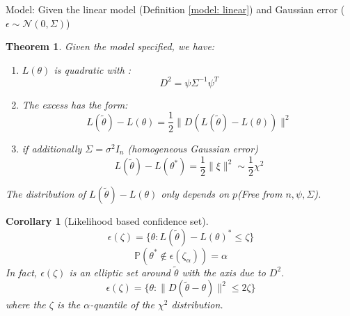 \documentclass[a4paper,12pt, oneside, fleqn]{book}
\newtheorem{theorem}{Theorem}[section]
\newtheorem{corollary}{Corollary}[theorem]
\theoremstyle{definition}
\theoremstyle{remark}
\begin{document}
Model: Given the  linear model (Definition \ref{model: linear}) and Gaussian error ($\epsilon \sim \mathcal{N}(0, \Sigma)$)
\begin{theorem}
Given the model specified, we have:
	\begin{enumerate}
		\item $L(\theta)$ is quadratic with :
			\begin{equation*}
				D^2 = \psi \Sigma^{-1} \psi^T
			\end{equation*}
		\item The excess has the form:
			\begin{equation*}
				L(\tilde{\theta}) - L(\theta) = \frac{1}{2} \| D (L(\tilde{\theta}) - L(\theta)) \|^2 
			\end{equation*}
		\item if additionally $\Sigma = \sigma^2 I_n$ (homogeneous Gaussian error)
			\begin{equation} 
				L(\tilde{\theta}) - L(\theta^*) = \frac{1}{2} \| \xi \|^2 \sim \frac{1}{2} \chi^2
			\end{equation}
	\end{enumerate}
	The distribution of $L(\tilde{\theta}) - L(\theta)$ only depends on $p$(Free from $n, \psi, \Sigma$).
\end{theorem}


\begin{corollary}[Likelihood based confidence set]
	\begin{equation*}
		\epsilon(\zeta)= \{ \theta : L(\tilde{\theta}) - L(\theta)^* \leq \zeta \}
	\end{equation*}
	\begin{equation*}
		\mathbb{P} (\theta^* \notin \epsilon(\zeta_\alpha) ) = \alpha
	\end{equation*}
	In fact, $\epsilon(\zeta)$ is an elliptic set around $\tilde{\theta}$ with the axis due to $D^2$.
	\begin{equation*}
		\epsilon(\zeta) = \{\theta: \| D (\tilde{\theta} - \theta) \|^2 \leq 2 \zeta \}
	\end{equation*}
	where the $\zeta$ is the $\alpha$-quantile of the $\chi^2$ distribution.
\end{corollary}
\end{document}
